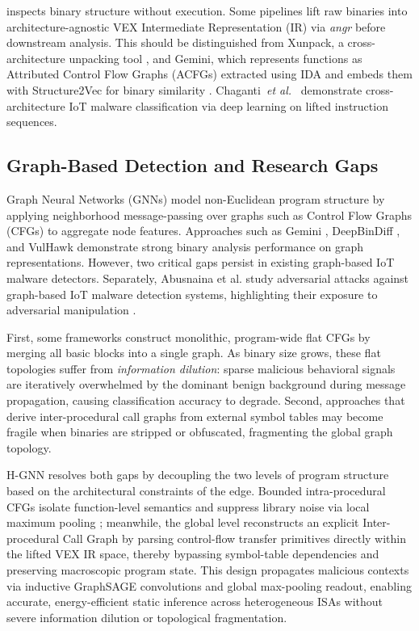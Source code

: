 \documentclass[conference]{IEEEtran}
\begin{document}
 inspects binary structure without
execution. Some pipelines lift raw binaries into architecture-agnostic
VEX Intermediate Representation (IR) via \textit{angr} before downstream
analysis.
This should be distinguished from Xunpack, a cross-architecture
unpacking tool \cite{b4}, and Gemini, which represents functions as
Attributed Control Flow Graphs (ACFGs) extracted using IDA and embeds them
with Structure2Vec for binary similarity \cite{b8}.
Chaganti~\textit{et al.}~\cite{b5} demonstrate cross-architecture
IoT malware classification via deep learning on lifted instruction
sequences.

\subsection{Graph-Based Detection and Research Gaps}

Graph Neural Networks (GNNs) model non-Euclidean program
structure by applying neighborhood message-passing over graphs such as
Control Flow Graphs (CFGs) to aggregate node features.
Approaches such as Gemini \cite{b8}, DeepBinDiff \cite{b9}, and VulHawk
\cite{b10} demonstrate strong binary analysis performance on
graph representations. However, two critical gaps persist
in existing graph-based IoT malware detectors.
Separately, Abusnaina et al. study adversarial attacks against
graph-based IoT malware detection systems, highlighting their exposure to
adversarial manipulation \cite{b6}.

First, some frameworks construct monolithic, program-wide
flat CFGs by merging all basic blocks into a single graph.
As binary size grows, these flat topologies suffer
from \textit{information dilution}: sparse malicious
behavioral signals are iteratively overwhelmed by the
dominant benign background during message propagation, causing
classification accuracy to degrade. Second, approaches that derive
inter-procedural call graphs from external symbol tables may become fragile
when binaries are stripped or obfuscated, fragmenting the global graph
topology.

H-GNN resolves both gaps by decoupling the two levels of program structure based 
on the architectural constraints of the edge. Bounded intra-procedural CFGs isolate 
function-level semantics and suppress library noise via local maximum pooling \cite{b6}; 
meanwhile, the global level reconstructs an explicit Inter-procedural Call Graph 
by parsing control-flow transfer primitives directly within the lifted VEX IR space, 
thereby bypassing symbol-table dependencies and preserving macroscopic program state. 
This design propagates malicious contexts via inductive GraphSAGE convolutions and 
global max-pooling readout, enabling accurate, energy-efficient static inference 
across heterogeneous ISAs without severe information dilution or topological fragmentation.
\end{document}
